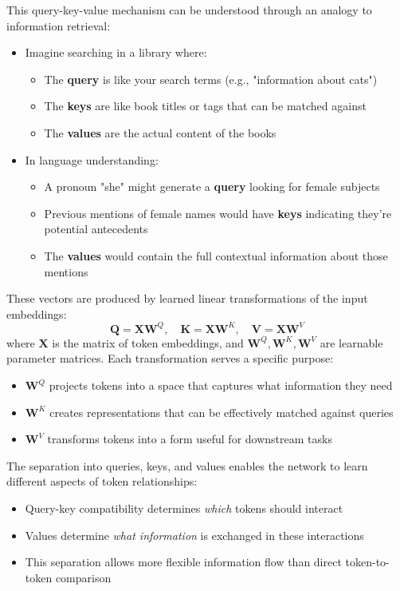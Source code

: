 \noindent
This query-key-value mechanism can be understood through an analogy to information retrieval:
\begin{itemize}
    \item Imagine searching in a library where:
    \begin{itemize}
        \item The \textbf{query} is like your search terms (e.g., "information about cats")
        \item The \textbf{keys} are like book titles or tags that can be matched against
        \item The \textbf{values} are the actual content of the books
    \end{itemize}
    \item In language understanding:
    \begin{itemize}
        \item A pronoun "she" might generate a \textbf{query} looking for female subjects
        \item Previous mentions of female names would have \textbf{keys} indicating they're potential antecedents
        \item The \textbf{values} would contain the full contextual information about those mentions
    \end{itemize}
\end{itemize}

\noindent
These vectors are produced by learned linear transformations of the input embeddings:
\begin{equation}\label{eq:qkv_projection}
    \mathbf{Q} = \mathbf{X}\mathbf{W}^Q, 
    \quad
    \mathbf{K} = \mathbf{X}\mathbf{W}^K, 
    \quad
    \mathbf{V} = \mathbf{X}\mathbf{W}^V
\end{equation}
where $\mathbf{X}$ is the matrix of token embeddings, and $\mathbf{W}^Q, \mathbf{W}^K, \mathbf{W}^V$ are learnable parameter matrices. Each transformation serves a specific purpose:
\begin{itemize}
    \item $\mathbf{W}^Q$ projects tokens into a space that captures what information they need
    \item $\mathbf{W}^K$ creates representations that can be effectively matched against queries
    \item $\mathbf{W}^V$ transforms tokens into a form useful for downstream tasks
\end{itemize}

\noindent
The separation into queries, keys, and values enables the network to learn different aspects of token relationships:
\begin{itemize}
    \item Query-key compatibility determines \emph{which} tokens should interact
    \item Values determine \emph{what information} is exchanged in these interactions
    \item This separation allows more flexible information flow than direct token-to-token comparison
\end{itemize}


